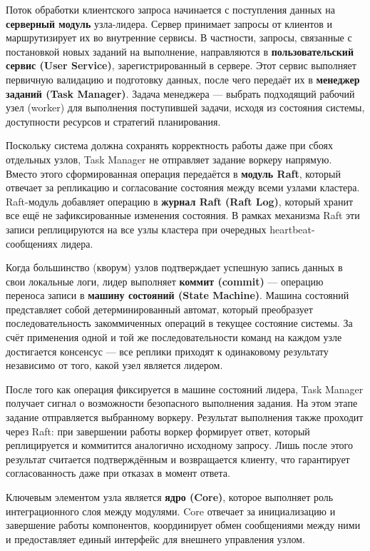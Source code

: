 Поток обработки клиентского запроса начинается с поступления данных на
\textbf{серверный модуль} узла-лидера. Сервер принимает запросы от клиентов и
маршрутизирует их во внутренние сервисы. В частности, запросы, связанные с
постановкой новых заданий на выполнение, направляются в
\textbf{пользовательский сервис (User Service)}, зарегистрированный в сервере.
Этот сервис выполняет первичную валидацию и подготовку данных, после чего
передаёт их в \textbf{менеджер заданий (Task Manager)}. Задача менеджера —
выбрать подходящий рабочий узел (worker) для выполнения поступившей задачи,
исходя из состояния системы, доступности ресурсов и стратегий планирования.

Поскольку система должна сохранять корректность работы даже при сбоях
отдельных узлов, Task Manager не отправляет задание воркеру напрямую.
Вместо этого сформированная операция передаётся в
\textbf{модуль Raft}, который отвечает за репликацию и согласование
состояния между всеми узлами кластера. Raft-модуль добавляет операцию
в \textbf{журнал Raft (Raft Log)}, который хранит все ещё не
зафиксированные изменения состояния. В рамках механизма Raft эти записи
реплицируются на все узлы кластера при очередных heartbeat-сообщениях
лидера.

Когда большинство (кворум) узлов подтверждает успешную запись данных в свои
локальные логи, лидер выполняет \textbf{коммит (commit)} — операцию переноса
записи в \textbf{машину состояний (State Machine)}. Машина состояний
представляет собой детерминированный автомат, который преобразует
последовательность закоммиченных операций в текущее состояние системы. За счёт
применения одной и той же последовательности команд на каждом узле достигается
консенсус — все реплики приходят к одинаковому результату независимо от того,
какой узел является лидером.

После того как операция фиксируется в машине состояний лидера, Task Manager
получает сигнал о возможности безопасного выполнения задания. На этом этапе
задание отправляется выбранному воркеру. Результат выполнения также проходит
через Raft: при завершении работы воркер формирует ответ, который реплицируется
и коммитится аналогично исходному запросу. Лишь после этого результат считается
подтверждённым и возвращается клиенту, что гарантирует согласованность даже при
отказах в момент ответа.

Ключевым элементом узла является \textbf{ядро (Core)}, которое выполняет роль
интеграционного слоя между модулями. Core отвечает за инициализацию и
завершение работы компонентов, координирует обмен сообщениями между ними и
предоставляет единый интерфейс для внешнего управления узлом.

